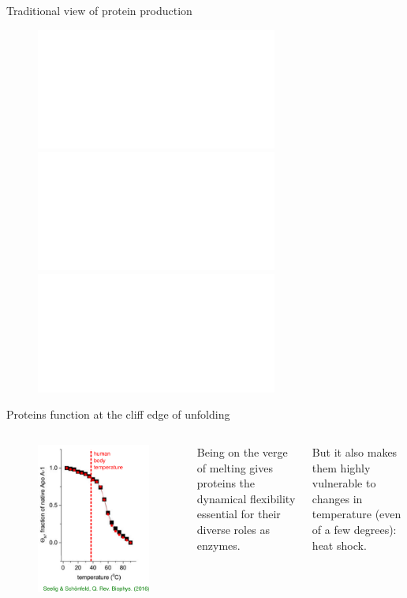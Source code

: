 \documentclass{beamer}
\begin{document}
\begin{frame}{Traditional view of protein production}

  \begin{figure}
    \includegraphics<1>[width=\textwidth]{dogma1.pdf}\includegraphics<2>[width=\textwidth]{dogma1b.pdf}\includegraphics<3>[width=\textwidth]{dogma2.pdf}
  \end{figure}
  
\end{frame}

\begin{frame}{Proteins function at the cliff edge of unfolding}

  \begin{columns}
  \begin{figure}
    \includegraphics[width=\textwidth]{thermal_unfold.pdf}
  \end{figure}

  \pause
   Being on the verge of melting gives proteins
  the {\color{blue}dynamical flexibility} essential for their diverse roles as enzymes.

  \pause

  \vspace{1em}
  
  But it also makes them highly vulnerable to changes in temperature
  (even of a few degrees):  {\color{red} heat shock}.
  \end{columns}
\end{frame}
\end{document}
